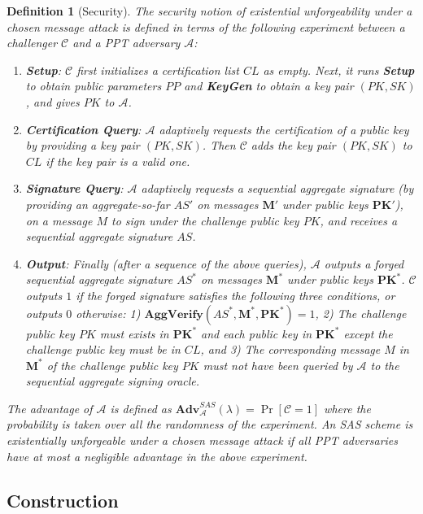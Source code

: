 \documentclass[11pt,letterpaper]{article}
\newcommand{\vect}[1]{\mathbf{#1}}
\newtheorem{definition}[theorem]{Definition}
\newcommand{\Adv}{\textbf{Adv}}
\newcommand{\mc}[1]{\mathcal{#1}}
\newcommand{\tb}[1]{\textbf{#1}}
\begin{document}
\begin{definition}[Security]
The security notion of existential unforgeability under a chosen message
attack is defined in terms of the following experiment between a challenger
$\mc{C}$ and a PPT adversary $\mc{A}$:
\begin{enumerate}
\item \tb{Setup}: $\mc{C}$ first initializes a certification list $CL$ as
    empty. Next, it runs \tb{Setup} to obtain public parameters $PP$ and
    \tb{KeyGen} to obtain a key pair $(PK,SK)$, and gives $PK$ to $\mc{A}$.

\item \tb{Certification Query}: $\mc{A}$ adaptively requests the
    certification of a public key by providing a key pair $(PK,SK)$. Then
    $\mc{C}$ adds the key pair $(PK,SK)$ to $CL$ if the key pair is a valid
    one.

\item \tb{Signature Query}: $\mc{A}$ adaptively requests a sequential
    aggregate signature (by providing an aggregate-so-far $AS'$ on messages
    $\vect{M}'$ under public keys $\vect{PK}'$), on a message $M$ to sign
    under the challenge public key $PK$, and receives a sequential
    aggregate signature $AS$.

\item \tb{Output}: Finally (after a sequence of the above queries),
    $\mc{A}$ outputs a forged sequential aggregate signature $AS^*$ on
    messages $\vect{M}^*$ under public keys $\vect{PK}^*$. $\mc{C}$ outputs
    $1$ if the forged signature satisfies the following three conditions,
    or outputs $0$ otherwise: 1) $\tb{AggVerify}(AS^*, \vect{M}^*,
    \vect{PK}^*) = 1$, 2) The challenge public key $PK$ must exists in
    $\vect{PK}^*$ and each public key in $\vect{PK}^*$ except the challenge
    public key must be in $CL$, and 3) The corresponding message $M$ in
    $\vect{M}^*$ of the challenge public key $PK$ must not have been
    queried by $\mc{A}$ to the sequential aggregate signing oracle.
\end{enumerate}
The advantage of $\mc{A}$ is defined as $\Adv_{\mc{A}}^{SAS}(\lambda) = \Pr
[\mc{C} = 1]$ where the probability is taken over all the randomness of the
experiment. An SAS scheme is existentially unforgeable under a chosen message
attack if all PPT adversaries have at most a negligible advantage in the
above experiment.
\end{definition}

\subsection{Construction}
\end{document}
